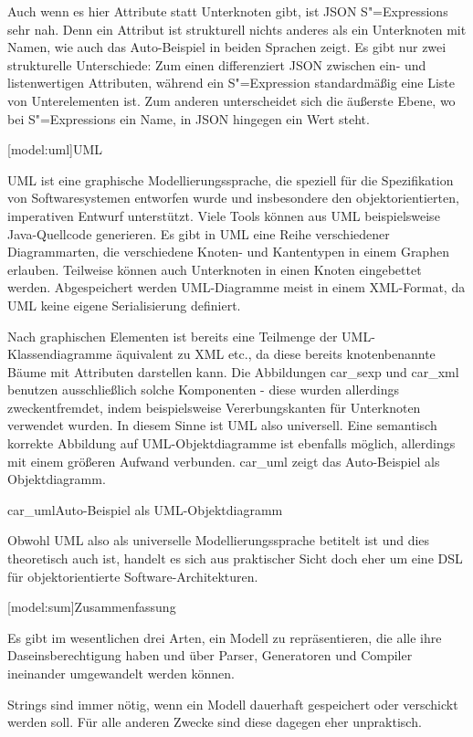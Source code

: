 \documentclass[11pt, a4paper, bibgerm]{scrbook}
\newcommand\lsection{}
\newcommand\fref{}
\newcommand\abb{}
\newcommand\fig{}
\newcommand{\sexp}{S"=Expression}
\newcommand{\sexps}{S"=Expressions}
\begin{document}
Auch wenn es hier Attribute statt Unterknoten gibt, ist JSON \sexps{}
sehr nah. Denn ein Attribut ist strukturell nichts anderes als ein
Unterknoten mit Namen, wie auch das Auto-Beispiel in beiden Sprachen
zeigt. Es gibt nur zwei strukturelle Unterschiede: Zum einen
differenziert JSON zwischen ein- und listenwertigen Attributen, während
ein \sexp{} standardmäßig eine Liste von Unterelementen ist. Zum anderen
unterscheidet sich die äußerste Ebene, wo bei \sexps{} ein Name, in JSON
hingegen ein Wert steht.

\lsection[model:uml]{UML}

UML ist eine graphische Modellierungssprache, die speziell für die
Spezifikation von Softwaresystemen entworfen wurde und insbesondere den
objektorientierten, imperativen Entwurf unterstützt. Viele Tools können
aus UML beispielsweise Java-Quellcode generieren. Es gibt in UML eine
Reihe verschiedener Diagrammarten, die verschiedene Knoten- und
Kantentypen in einem Graphen erlauben. Teilweise können auch Unterknoten
in einen Knoten eingebettet werden. Abgespeichert werden UML-Diagramme
meist in einem XML-Format, da UML keine eigene Serialisierung definiert.

Nach graphischen Elementen ist bereits eine Teilmenge der
UML-Klassen\-diagramme äquivalent zu XML etc., da diese bereits
knotenbenannte Bäume mit Attributen darstellen kann. Die Abbildungen
\fref{car_sexp} und \fref{car_xml} benutzen ausschließlich solche
Komponenten - diese wurden allerdings zweckentfremdet, indem
beispielsweise Vererbungskanten für Unterknoten verwendet wurden. In
diesem Sinne ist UML also universell. Eine semantisch korrekte Abbildung
auf UML-Objektdiagramme ist ebenfalls möglich, allerdings mit einem
größeren Aufwand verbunden. \abb{car_uml} zeigt das Auto-Beispiel als
Objektdiagramm.

\fig{car_uml}{Auto-Beispiel als UML-Objektdiagramm}

Obwohl UML also als universelle Modellierungssprache betitelt ist und
dies theoretisch auch ist, handelt es sich aus praktischer Sicht doch
eher um eine DSL für objektorientierte Software-Architekturen.

\lsection[model:sum]{Zusammenfassung}

Es gibt im wesentlichen drei Arten, ein Modell zu repräsentieren, die
alle ihre Daseinsberechtigung haben und über Parser, Generatoren und
Compiler ineinander umgewandelt werden können.

Strings sind immer nötig, wenn ein Modell dauerhaft gespeichert oder
verschickt werden soll. Für alle anderen Zwecke sind diese dagegen eher
unpraktisch.
\end{document}
